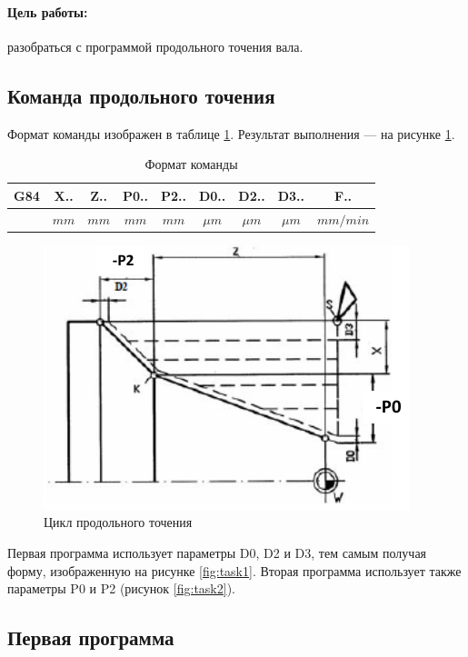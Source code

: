 \paragraph{Цель работы:} разобраться с программой продольного точения вала.

\subsection*{Команда продольного точения}

Формат команды изображен в таблице \ref{tab:format}. Результат выполнения --- на рисунке \ref{fig:main}.

\begin{longtable}[c]{|c|c|c|c|c|c|c|c|c|}
    \caption{Формат команды}
    \label{tab:format}\\
    \hline
    \multirow{2}{*}{\textbf{G84}} & \textbf{X..} & \textbf{Z..} & \textbf{P0..} & \textbf{P2..} & \textbf{D0..} & \textbf{D2..} & \textbf{D3..} & \textbf{F..}\\
    \cline{2-9}
    \endfirsthead
        & $mm$ & $mm$ & $mm$ & $mm$ & $\mu m$ & $\mu m$ & $\mu m$ & $mm/min$\\
        \hline
\end{longtable}

\begin{figure}[ht]
    \includegraphics[width=.8\linewidth]{Figures/main.png}
    \caption{Цикл продольного точения}
    \label{fig:main}
\end{figure}

Первая программа использует параметры D0, D2 и D3, тем самым получая форму, изображенную на рисунке \ref{fig:task1}. Вторая программа использует также параметры P0 и P2 (рисунок \ref{fig:task2}).

\subsection*{Первая программа}

